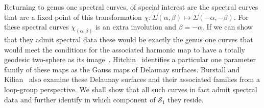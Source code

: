 \documentclass{article}
\numberwithin{equation}{section}
\numberwithin{figure}{section}
\renewcommand*{\bar}{\overline}
\newcommand{\bra}[1]{\left(#1\right)}
\newcommand{\abs}[1]{\left|#1\right|}
\newcommand{\iu}{i}
\begin{document}

Returning to genus one spectral curves, of special interest are the spectral curves that are a fixed point of this transformation $\chi: \Sigma(\alpha,\beta) \mapsto \Sigma(-\alpha,-\beta)$. For these spectral curves $\chi_{(\alpha,\beta)}$ is an extra involution and $\beta=-\alpha$. If we can show that they admit spectral data these would be exactly the genus one curves that would meet the conditions for the associated harmonic map to have a totally geodesic two-sphere as its image~\cite[Theorem~8.20]{Hitchin1990}. Hitchin~\cite[p693]{Hitchin1990} identifies a particular one parameter family of these maps as the Gauss maps of Delaunay surfaces. Burstall and Kilian~\cite{Burstall2006} also examine these Delaunay surfaces and their associated families from a loop-group perspective. We shall show that all such curves in fact admit spectral data and further identify in which component of $\mathcal{S}_1$ they reside.
\end{document}
